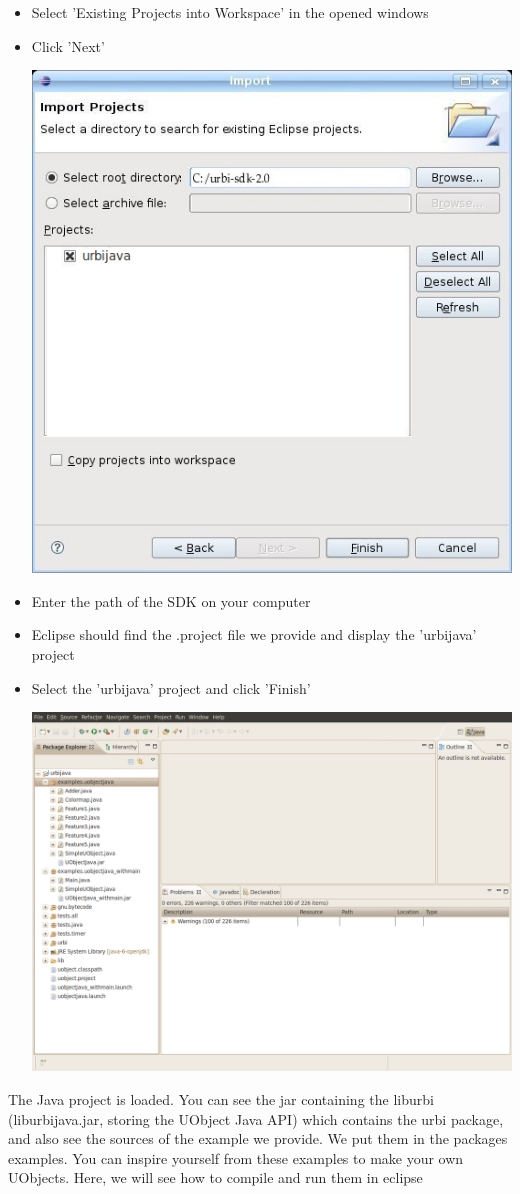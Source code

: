 \begin{itemize}
\item Select 'Existing Projects into Workspace' in the opened windows
\item Click 'Next'

\begin{center}
  \includegraphics[width=0.6\linewidth]{img/select-proj}
\end{center}

\item Enter the path of the \urbi SDK on your computer
\item Eclipse should find the .project file we provide and display the 'urbijava' project
\item Select the 'urbijava' project and click 'Finish'

\begin{center}
  \includegraphics[width=0.6\linewidth]{img/project-uobject-open}
\end{center}

\end{itemize}

The Java project is loaded. You can see the jar containing the liburbi
(liburbijava.jar, storing the UObject Java API) which contains the urbi package, and
also see the sources of the example we provide. We put them in the packages
examples.  You can inspire yourself from these examples to make
your own UObjects.  Here, we will see how to compile and run them in eclipse

